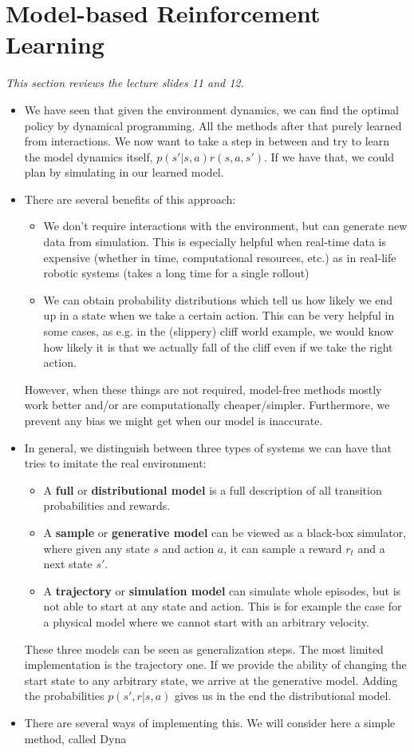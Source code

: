 \section{Model-based Reinforcement Learning}
\label{sec:model_based}
\textit{This section reviews the lecture slides 11 and 12.}
\begin{itemize}
	\item We have seen that given the environment dynamics, we can find the optimal policy by dynamical programming. All the methods after that purely learned from interactions. We now want to take a step in between and try to learn the model dynamics itself, $p(s'|s,a)r(s,a,s')$. If we have that, we could plan by simulating in our learned model.
	\item There are several benefits of this approach:
	\begin{itemize}
		\item We don't require interactions with the environment, but can generate new data from simulation. This is especially helpful when real-time data is expensive (whether in time, computational resources, etc.) as in real-life robotic systems (takes a long time for a single rollout)
		\item We can obtain probability distributions which tell us how likely we end up in a state when we take a certain action. This can be very helpful in some cases, as e.g. in the (slippery) cliff world example, we would know how likely it is that we actually fall of the cliff even if we take the right action. 
	\end{itemize}
	However, when these things are not required, model-free methods mostly work better and/or are computationally cheaper/simpler. Furthermore, we prevent any bias we might get when our model is inaccurate.
	\item In general, we distinguish between three types of systems we can have that tries to imitate the real environment:
	\begin{itemize}
		\item A \textbf{full} or \textbf{distributional model} is a full description of all transition probabilities and rewards. 
		\item A \textbf{sample} or \textbf{generative model} can be viewed as a black-box simulator, where given any state $s$ and action $a$, it can sample a reward $r_t$ and a next state $s'$.
		\item A \textbf{trajectory} or \textbf{simulation model} can simulate whole episodes, but is not able to start at any state and action. This is for example the case for a physical model where we cannot start with an arbitrary velocity.
	\end{itemize}
	These three models can be seen as generalization steps. The most limited implementation is the trajectory one. If we provide the ability of changing the start state to any arbitrary state, we arrive at the generative model. Adding the probabilities $p(s',r|s,a)$ gives us in the end the distributional model.
	\item There are several ways of implementing this. We will consider here a simple method, called Dyna
\end{itemize}
